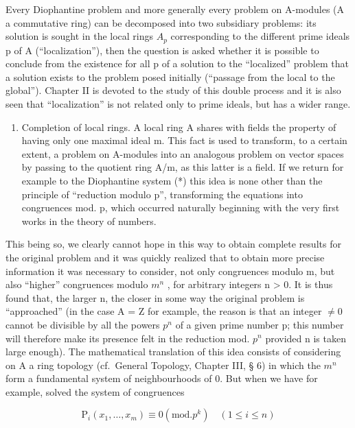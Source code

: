 Every Diophantine problem and more generally every problem on A-modules (A a commutative ring) can be decomposed into two subsidiary problems: its solution is sought in the local rings \(A_{p}\) corresponding to the different prime ideals p of A (``localization''), then the question is asked whether it is possible to conclude from the existence for all p of a solution to the ``localized'' problem that a solution exists to the problem posed initially (``passage from the local to the global''). Chapter II is devoted to the study of this double process and it is also seen that ``localization'' is not related only to prime ideals, but has a wider range.

\begin{enumerate}
\def\labelenumi{\Roman{enumi}.}
\setcounter{enumi}{1}
\tightlist
\item
  Completion of local rings. A local ring A shares with fields the property of having only one maximal ideal m. This fact is used to transform, to a certain extent, a problem on A-modules into an analogous problem on vector spaces by passing to the quotient ring A/m, as this latter is a field. If we return for example to the Diophantine system (*) this idea is none other than the principle of ``reduction modulo p'', transforming the equations into congruences mod. p, which occurred naturally beginning with the very first works in the theory of numbers.
\end{enumerate}

This being so, we clearly cannot hope in this way to obtain complete results for the original problem and it was quickly realized that to obtain more precise information it was necessary to consider, not only congruences modulo m, but also ``higher'' congruences modulo \(m^{n}\) , for arbitrary integers n \textgreater{} 0. It is thus found that, the larger n, the closer in some way the original problem is ``approached'' (in the case A = Z for example, the reason is that an integer \(\neq 0\) cannot be divisible by all the powers \(p^{n}\) of a given prime number p; this number will therefore make its presence felt in the reduction mod. \(p^{n}\) provided n is taken large enough). The mathematical translation of this idea consists of considering on A a ring topology (cf.~General Topology, Chapter III, § 6) in which the \(m^{n}\) form a fundamental system of neighbourhoods of 0. But when we have for example, solved the system of congruences

\[
\mathrm{P} _ {i} (x _ {1}, \dots , x _ {m}) \equiv 0 (\mathrm{mod.} p ^ {k}) \quad (1 \leqslant i \leqslant n)\tag{**}
\]

